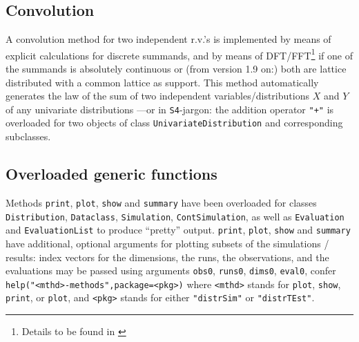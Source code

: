 \documentclass[11pt]{article}
\newcommand{\code}[1]{{\tt #1}}
\newcommand{\pkg}[1]{{\tt "#1"}}
\begin{document}
\subsection{Convolution}
%
A convolution method for two independent r.v.'s is implemented by means 
of explicit calculations for discrete summands, and by means of 
DFT/FFT\footnote{Details to be found in \cite{K:R:S:04}} if one of the summands is 
absolutely continuous or (from version 1.9 on:) both are lattice distributed 
with a common lattice as support.
This method automatically generates the law of the sum of two independent 
variables/distributions $X$ and $Y$ of any univariate distributions ---or 
in {\tt S4}-jargon: the addition operator \code{"+"} is overloaded for two 
objects of class \code{UnivariateDistribution} and corresponding subclasses.
%
\subsection{Overloaded generic functions}
Methods \code{print}, \code{plot}, \code{show} and \code{summary} have been 
overloaded for classes \code{Distribution}, \code{Dataclass}, \code{Simulation}, 
\code{ContSimulation}, as well as \code{Evaluation} and \code{EvaluationList} to 
produce ``pretty''  output. %
\code{print}, \code{plot}, \code{show} and \code{summary} have additional, 
optional arguments for plotting subsets of the simulations / results:
index vectors for the dimensions, the runs, the observations, and the 
evaluations may be passed using arguments \code{obs0},  \code{runs0}, 
\code{dims0}, \code{eval0}, confer
\code{help("<mthd>-methods",package=<pkg>)} where \code{<mthd>} stands for 
\code{plot}, \code{show}, \code{print}, or \code{plot}, and \code{<pkg>} stands 
for either \pkg{distrSim} or \pkg{distrTEst}.
\end{document}
